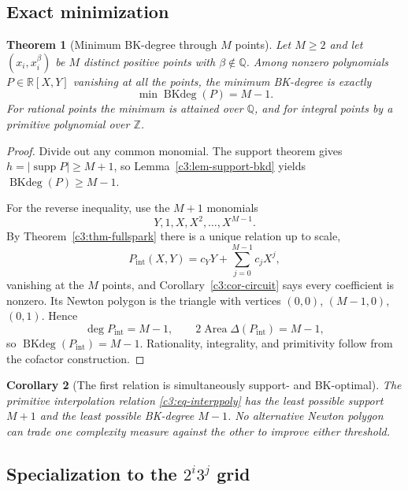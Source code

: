 \documentclass[11pt,oneside]{article}
\newtheorem{theorem}{Theorem}[section]
\newtheorem{corollary}[theorem]{Corollary}
\theoremstyle{definition}
\theoremstyle{remark}
\newcommand{\Z}{\mathbb Z}
\newcommand{\Q}{\mathbb Q}
\newcommand{\R}{\mathbb R}
\newcommand{\supp}{\operatorname{supp}}
\newcommand{\BKd}{\operatorname{BKdeg}}
\begin{document}
\subsection{Exact minimization}

\begin{theorem}[Minimum BK-degree through $M$ points]
\label{c3:thm-min-bkd}
Let $M\ge2$ and let $(x_i,x_i^\beta)$ be $M$ distinct positive points with
$\beta\notin\Q$.  Among nonzero polynomials $P\in\R[X,Y]$ vanishing at all the points, the
minimum BK-degree is exactly
\begin{equation}
 \min\BKd(P)=M-1.
 \label{c3:eq-min-bkd}
\end{equation}
For rational points the minimum is attained over $\Q$, and for integral points by a primitive
polynomial over $\Z$.
\end{theorem}

\begin{proof}
Divide out any common monomial.  The support theorem gives
$h=|\supp P|\ge M+1$, so Lemma~\ref{c3:lem-support-bkd} yields
$\BKd(P)\ge M-1$.

For the reverse inequality, use the $M+1$ monomials
\[
 Y,1,X,X^2,\ldots,X^{M-1}.
\]
By Theorem~\ref{c3:thm-fullspark} there is a unique relation up to scale,
\begin{equation}
 P_{\mathrm{int}}(X,Y)=c_YY+\sum_{j=0}^{M-1}c_jX^j,
 \label{c3:eq-interppoly}
\end{equation}
vanishing at the $M$ points, and Corollary~\ref{c3:cor-circuit} says every coefficient is
nonzero.  Its Newton polygon is the triangle with vertices
$(0,0)$, $(M-1,0)$, $(0,1)$.  Hence
\[
 \deg P_{\mathrm{int}}=M-1,
 \qquad
 2\operatorname{Area}\Delta(P_{\mathrm{int}})=M-1,
\]
so $\BKd(P_{\mathrm{int}})=M-1$.  Rationality, integrality, and primitivity follow from the
cofactor construction.
\end{proof}

\begin{corollary}[The first relation is simultaneously support- and BK-optimal]
\label{c3:cor-double-optimal}
The primitive interpolation relation \eqref{c3:eq-interppoly} has the least possible support
$M+1$ and the least possible BK-degree $M-1$.  No alternative Newton polygon can trade one
complexity measure against the other to improve either threshold.
\end{corollary}

\subsection{Specialization to the $2^i3^j$ grid}
\end{document}
